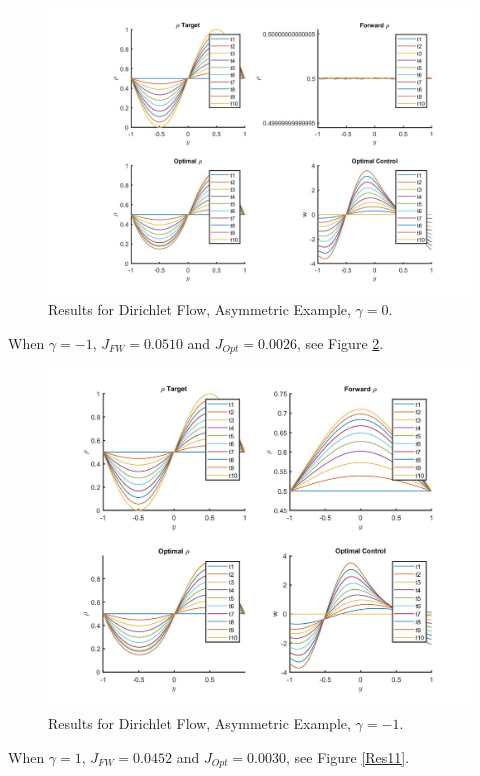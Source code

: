 \documentclass[11pt, a4paper]{article}
\theoremstyle{definition}
\begin{document}
\begin{figure}[h]
	\includegraphics[scale=0.3]{Res01.jpg}
	\caption{Results for Dirichlet Flow, Asymmetric Example, $\gamma = 0$.}
	\label{Res01}
\end{figure}

When $\gamma = -1$, $J_{FW} = 0.0510$ and $J_{Opt} = 0.0026$, see Figure \ref{Resn11}.

\begin{figure}[h]
	\includegraphics[scale=0.3]{Resn11.jpg}
	\caption{Results for Dirichlet Flow, Asymmetric Example, $\gamma = -1$.}
	\label{Resn11}
\end{figure}

When $\gamma = 1$, $J_{FW} = 0.0452$ and $J_{Opt} = 0.0030$, see Figure \ref{Res11}.
\end{document}
